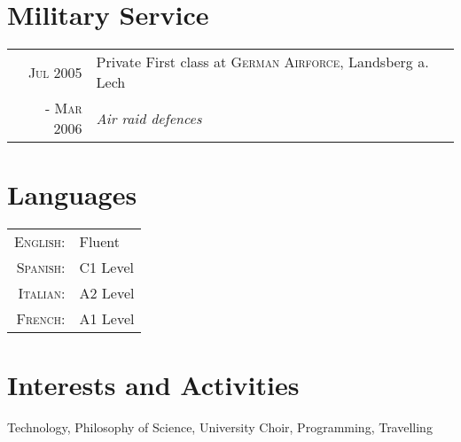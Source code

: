 \documentclass[a4paper,10pt]{article}
\begin{document}
\section{Military Service}
\begin{tabular}{r|p{11cm}}
 \textsc{Jul 2005}& Private First class at \textsc{German Airforce}, Landsberg a. Lech \\\textsc{- Mar 2006}&\emph{Air raid defences}\\
\end{tabular}

\section{Languages}
\begin{tabular}{rl}
\textsc{English:}&Fluent\\
\textsc{Spanish:}& C1 Level\\
\textsc{Italian:}&  A2 Level\\
\textsc{French:}& A1 Level\\
\end{tabular}

\section{Interests and Activities}
Technology, Philosophy of Science, University Choir, Programming, Travelling\\

\newpage
\end{document}
